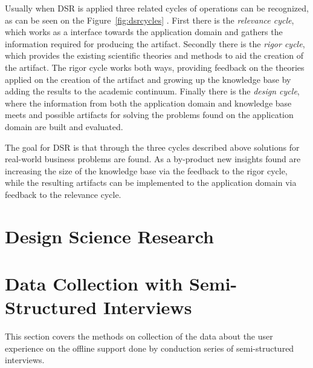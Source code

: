 Usually when DSR is applied three related cycles of operations can be recognized, as can be seen on the Figure~\ref{fig:dsrcycles} \cite{hevner_three_2007}. First there is the \textit{relevance cycle}, which works as a interface towards the application domain and gathers the information required for producing the artifact. Secondly there is the \textit{rigor cycle}, which provides the existing scientific theories and methods to aid the creation of the artifact. The rigor cycle works both ways, providing feedback on the theories applied on the creation of the artifact and growing up the knowledge base by adding the results to the academic continuum. Finally there is the \textit{design cycle}, where the information from both the application domain and knowledge base meets and possible artifacts for solving the problems found on the application domain are built and evaluated. 

The goal for DSR is that through the three cycles described above solutions for real-world business problems are found. As a by-product new insights found are increasing the size of the knowledge base via the feedback to the rigor cycle, while the resulting artifacts can be implemented to the application domain via feedback to the relevance cycle. \cite{piirainen_constructive_2013}








\section{Design Science Research}
















\section{Data Collection with Semi-Structured Interviews}

This section covers the methods on collection of the data about the user experience on the offline support done by conduction series of semi-structured interviews.

